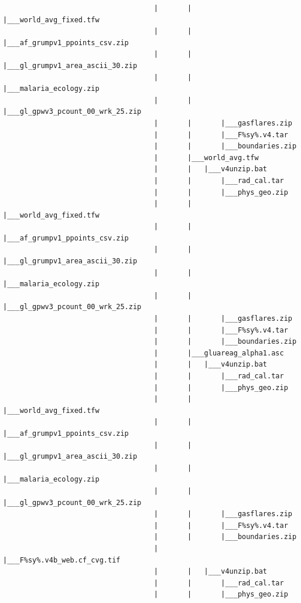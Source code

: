 \documentclass[]{book}
\begin{document}
\begin{verbatim}
                                    |       |       |___world_avg_fixed.tfw
                                    |       |       |___af_grumpv1_ppoints_csv.zip
                                    |       |       |___gl_grumpv1_area_ascii_30.zip
                                    |       |       |___malaria_ecology.zip
                                    |       |       |___gl_gpwv3_pcount_00_wrk_25.zip
                                    |       |       |___gasflares.zip
                                    |       |       |___F%sy%.v4.tar
                                    |       |       |___boundaries.zip
                                    |       |___world_avg.tfw
                                    |       |   |___v4unzip.bat
                                    |       |       |___rad_cal.tar
                                    |       |       |___phys_geo.zip
                                    |       |       |___world_avg_fixed.tfw
                                    |       |       |___af_grumpv1_ppoints_csv.zip
                                    |       |       |___gl_grumpv1_area_ascii_30.zip
                                    |       |       |___malaria_ecology.zip
                                    |       |       |___gl_gpwv3_pcount_00_wrk_25.zip
                                    |       |       |___gasflares.zip
                                    |       |       |___F%sy%.v4.tar
                                    |       |       |___boundaries.zip
                                    |       |___gluareag_alpha1.asc
                                    |       |   |___v4unzip.bat
                                    |       |       |___rad_cal.tar
                                    |       |       |___phys_geo.zip
                                    |       |       |___world_avg_fixed.tfw
                                    |       |       |___af_grumpv1_ppoints_csv.zip
                                    |       |       |___gl_grumpv1_area_ascii_30.zip
                                    |       |       |___malaria_ecology.zip
                                    |       |       |___gl_gpwv3_pcount_00_wrk_25.zip
                                    |       |       |___gasflares.zip
                                    |       |       |___F%sy%.v4.tar
                                    |       |       |___boundaries.zip
                                    |       |___F%sy%.v4b_web.cf_cvg.tif
                                    |       |   |___v4unzip.bat
                                    |       |       |___rad_cal.tar
                                    |       |       |___phys_geo.zip

\end{verbatim}
\end{document}
